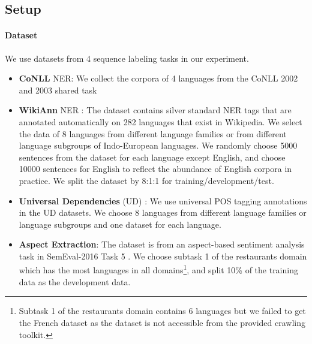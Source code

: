\documentclass[11pt,a4paper]{article}
\begin{document}
\subsection{Setup}
\paragraph{Dataset} We use datasets from 4 sequence labeling tasks in our experiment. 
\begin{itemize}
\item {\bf CoNLL} NER: We collect the corpora of 4 languages from the CoNLL 2002 and 2003 shared task \cite{tjong-kim-sang-2002-introduction,tjong-kim-sang-de-meulder-2003-introduction}
    \item {\bf WikiAnn} NER \cite{pan-etal-2017-cross}: The dataset contains silver standard NER tags that are annotated automatically on 282 languages that exist in Wikipedia. We select the data of 8 languages from different language families or from different language subgroups of Indo-European languages. We randomly choose 5000 sentences from the dataset for each language except English, and choose 10000 sentences for English to reflect the abundance of English corpora in practice. We split the dataset by 8:1:1 for training/development/test.
    \item {\bf Universal Dependencies} (UD) \cite{nivre-etal-2016-universal}: We use universal POS tagging annotations in the UD datasets. We choose 8 languages from different language families or language subgroups and one dataset for each language.
    \item {\bf Aspect Extraction}: The dataset is from an aspect-based sentiment analysis task in SemEval-2016 Task 5 \cite{pontiki-etal-2016-semeval}. We choose subtask 1 of the restaurants domain which has the most languages in all domains\footnote{Subtask 1 of the restaurants domain contains 6 languages but we failed to get the French dataset as the dataset is not accessible from the provided crawling toolkit.}, and split 10\% of the training data as the development data.
\end{itemize}
\end{document}
